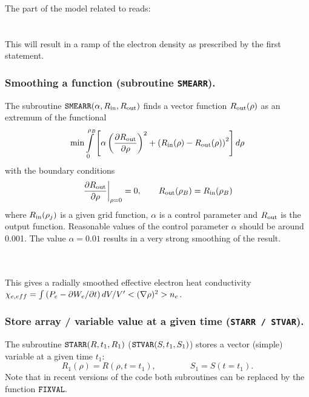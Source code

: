 
\hangindent=8mm\noindent
The part of the model related to  reads:
\\ \hspace*{15mm}
\\ \hspace*{15mm}
\\
This will result in a ramp of the electron density as prescribed by the
first statement. 

\subsubsection{Smoothing a function ({\rm subroutine \tt SMEARR}).}

The subroutine ${\tt SMEARR}(\alpha,R_{\rm in},R_{\rm out})$ finds a
vector function $R_{\rm out}(\rho)$ as an extremum of the functional 
$$
\mathop{\rm min}\int\limits_0^{\rho_B}\left[
\alpha\left(\displaystyle{\partial R_{\rm out}\over\partial \rho}\right)^2
+\left(R_{\rm in}(\rho)-R_{\rm out}(\rho)\right)^2
\right]d\rho
$$
with the boundary conditions
$$
\left.\displaystyle{\partial R_{\rm out}\over\partial \rho}\right|_{\rho=0}=0
,\qquad
R_{\rm out}(\rho_B)=R_{\rm in}(\rho_B)
$$
where $R_{\rm in}(\rho_j)$ is a given grid function, $\alpha$ is a
control parameter and $R_{\rm out}$ is the output function.
Reasonable values of the control parameter $\alpha$ should be around
0.001. 
The value $\alpha=0.01$ results in a very strong smoothing of the
result. 

\\ \hspace*{2cm}
\\ \hspace*{0.5cm}
This gives a radially smoothed effective electron heat conductivity
\\ \hspace*{2cm}
$
\chi_{e,eff}=\int\left(P_e-\partial W_e/\partial t\right)dV/V'<(\nabla\rho)^2>n_e
$.

\subsubsection{Store array / variable value at a given time 
({\tt STARR / STVAR}).}

The subroutine ${\tt STARR}(R,t_1,R_1)$ (${\tt STVAR}(S,t_1,S_1)$)
stores a vector (simple) variable at a given time $t_1:$
$$
R_1(\rho)=R(\rho,t=t_1)
,\qquad\qquad
S_1=S(t=t_1)
.$$
Note that in recent versions of the code both subroutines can be
replaced by the function ${\tt FIXVAL}.$

